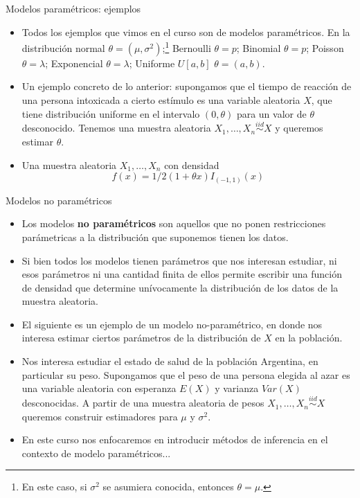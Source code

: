 \documentclass{beamer}
\theoremstyle{definition}
\begin{document}
\begin{frame}{\color{rosee}Modelos param\'etricos: ejemplos}\small
\begin{itemize}
    \item   Todos los ejemplos que vimos en el curso son de modelos paramétricos. En la distribución normal $\theta=(\mu,\sigma^2)$;\footnote{En este caso, si $\sigma^2$ se asumiera conocida, entonces $\theta=\mu$.} Bernoulli $\theta=p$; Binomial $\theta=p$; Poisson $\theta=\lambda$; Exponencial $\theta=\lambda$; Uniforme $U[a,b]$ $\theta=(a,b)$.
    \item     Un ejemplo concreto de lo anterior: supongamos que el tiempo de reacci\'on de una persona intoxicada a
    cierto est\'imulo es una variable aleatoria $X$, que tiene
    distribuci\'on uniforme en el intervalo $(0, \theta)$ para un valor
    de $\theta$ desconocido. Tenemos una muestra aleatoria
    $X_{1},\dots, X_{n}\stackrel{iid}{\sim} X$ y queremos estimar $\theta$.
    \item  Una muestra aleatoria $X_{1},\dots, X_{n}$ con densidad
    \[f(x)=1/2 (1+\theta x) I_{(-1,1)}(x)\]
\end{itemize}

 
  
 
\end{frame}

\begin{frame}{\color{rosee}Modelos no param\'etricos}\small
  \begin{itemize}
 \item    Los modelos \textbf{no param\'etricos} son aquellos que no ponen
    restricciones par\'ametricas a la distribuci\'on que suponemos
    tienen los datos.
    
\item Si bien todos los modelos tienen parámetros que nos interesan estudiar, ni esos parámetros ni una cantidad finita de ellos permite escribir una función de densidad que determine unívocamente la distribución de los datos de la muestra aleatoria. 

\item     El siguiente es un ejemplo de un modelo no-param\'etrico,
    en donde nos interesa estimar ciertos par\'ametros de la distribuci\'on de $X$ en la población.
  
  
 \item    Nos interesa estudiar el estado de salud de la poblaci\'on
    Argentina, en particular su peso. Supongamos que el peso de una
    persona elegida al azar es una variable aleatoria con esperanza
    $E(X)$ y varianza $Var(X)$ desconocidas. A partir de una muestra
    aleatoria de pesos $X_{1},\dots, X_{n}\stackrel{iid}{\sim} X$ queremos construir estimadores para $\mu$ y
    $\sigma^2$.


    \item En este curso nos enfocaremos en introducir métodos de inferencia en el contexto de modelo paramétricos...
\end{itemize}  
  
\end{frame}
\end{document}
